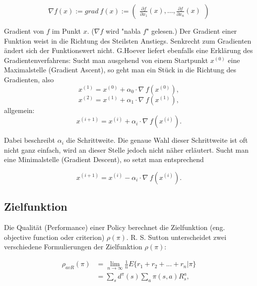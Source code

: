 \documentclass[conference]{IEEEtran}
\begin{document}
\begin{equation*}
\nabla f(x) := grad \: f(x) := \begin{pmatrix}
\frac{\partial f}{\partial x_1}(x), \hdots, \frac{\partial f}{\partial x_n}(x)
\end{pmatrix}
\end{equation*}

Gradient von $f$ im Punkt $x$. ($\nabla f$ wird "nabla $f$" gelesen.) Der Gradient einer Funktion weist in die Richtung des Steilsten Anstiegs. Senkrecht zum Gradienten ändert sich der Funktionswert nicht. G.Hoever \cite[vgl. S. 214]{hoever_14} liefert ebenfalls eine Erklärung des Gradientenverfahrens: Sucht man ausgehend von einem Startpunkt $x^{(0)}$ eine Maximalstelle (Gradient Ascent), so geht man ein Stück in die Richtung des Gradienten, also
\begin{equation*}
x^{(1)} = x^{(0)} + \alpha_0 \cdot \nabla \: f(x^{(0)}),
\end{equation*}
\begin{equation*}
x^{(2)} = x^{(1)} + \alpha_1 \cdot \nabla \: f(x^{(1)}),
\end{equation*}
allgemein:
\begin{equation*}
x^{(i+1)} = x^{(i)} + \alpha_i \cdot \nabla \: f(x^{(i)}).
\end{equation*}

Dabei beschreibt $\alpha_i$ die Schrittweite. Die genaue Wahl dieser Schrittweite ist oft nicht ganz einfach, wird an dieser Stelle jedoch nicht näher erläutert. Sucht man eine Minimalstelle (Gradient Descent), so setzt man entsprechend 

\begin{equation*}
x^{(i+1)} = x^{(i)} - \alpha_i \cdot \nabla \: f(x^{(i)}).
\end{equation*}

\subsection{Zielfunktion}
Die Qualität (Performance) einer Policy berechnet die Zielfunktion (eng. objective function oder criterion) $\rho(\pi)$. R. S. Sutton \cite{sutton_99} unterscheidet zwei verschiedene Formulierungen der Zielfunktion $\rho(\pi)$: 

\begin{equation*}
\begin{aligned}
\rho_{avR}(\pi) & = \lim\limits_{n \rightarrow \infty}{\frac{1}{n} E\{r_1 + r_2 + ... + r_n | \pi\}} \\
& = \sum_s d^\pi (s) \sum_a \pi(s,a) R^a_s,
\end{aligned}
\end{equation*}
\end{document}
